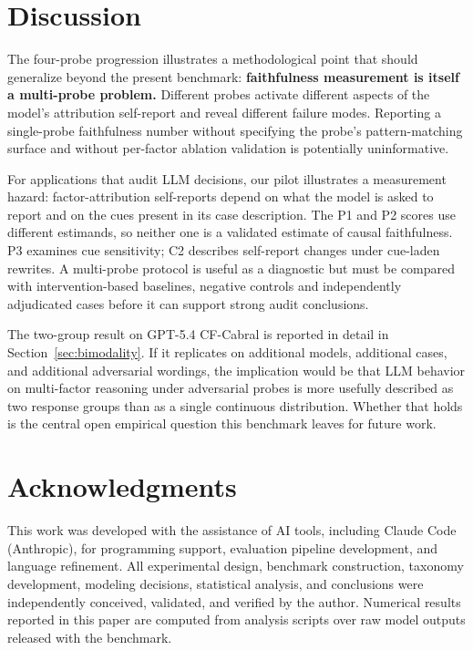 \documentclass[11pt]{article}
\begin{document}
\section{Discussion}

The four-probe progression illustrates a methodological point that should generalize beyond the present benchmark: \textbf{faithfulness measurement is itself a multi-probe problem.} Different probes activate different aspects of the model's attribution self-report and reveal different failure modes. Reporting a single-probe faithfulness number without specifying the probe's pattern-matching surface and without per-factor ablation validation is potentially uninformative.

For applications that audit LLM decisions, our pilot illustrates a measurement hazard: factor-attribution self-reports depend on what the model is asked to report and on the cues present in its case description. The P1 and P2 scores use different estimands, so neither one is a validated estimate of causal faithfulness. P3 examines cue sensitivity; C2 describes self-report changes under cue-laden rewrites. A multi-probe protocol is useful as a diagnostic but must be compared with intervention-based baselines, negative controls and independently adjudicated cases before it can support strong audit conclusions.

The two-group result on GPT-5.4 CF-Cabral is reported in detail in Section~\ref{sec:bimodality}. If it replicates on additional models, additional cases, and additional adversarial wordings, the implication would be that LLM behavior on multi-factor reasoning under adversarial probes is more usefully described as two response groups than as a single continuous distribution. Whether that holds is the central open empirical question this benchmark leaves for future work.

\section*{Acknowledgments}

This work was developed with the assistance of AI tools, including Claude Code (Anthropic), for programming support, evaluation pipeline development, and language refinement. All experimental design, benchmark construction, taxonomy development, modeling decisions, statistical analysis, and conclusions were independently conceived, validated, and verified by the author. Numerical results reported in this paper are computed from analysis scripts over raw model outputs released with the benchmark.
\end{document}
